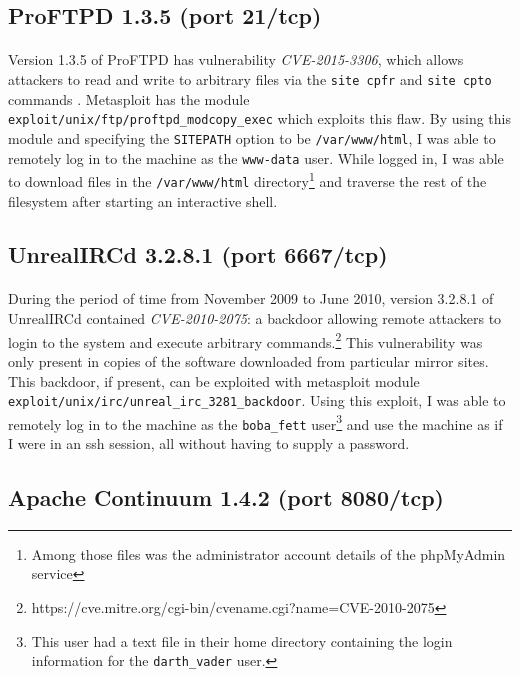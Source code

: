\documentclass{article}
\begin{document}
\subsection{ProFTPD 1.3.5 (port 21/tcp)}
\label{subsec:pro_ftpd}
\paragraph{}
Version 1.3.5 of ProFTPD has vulnerability \emph{CVE-2015-3306}, which allows attackers to read and write to arbitrary files via the \texttt{site cpfr} and \texttt{site cpto} commands \parencite{mitre20153306}.
Metasploit has the module \texttt{exploit/unix/ftp/proftpd\_modcopy\_exec} which exploits this flaw.
By using this module and specifying the \texttt{SITEPATH} option to be \texttt{/var/www/html}, I was able to remotely log in to the machine as the \texttt{www-data} user.
While logged in, I was able to download files in the \texttt{/var/www/html} directory\footnote{Among those files was the administrator account details of the phpMyAdmin service} and traverse the rest of the filesystem after starting an interactive shell.

\subsection{UnrealIRCd 3.2.8.1 (port 6667/tcp)}
\label{subsec:unreal_ircd}
\paragraph{}
During the period of time from November 2009 to June 2010, version 3.2.8.1 of UnrealIRCd contained \emph{CVE-2010-2075}: a backdoor allowing remote attackers to login to the system and execute arbitrary commands.\footnote{https://cve.mitre.org/cgi-bin/cvename.cgi?name=CVE-2010-2075}
This vulnerability was only present in copies of the software downloaded from particular mirror sites.
This backdoor, if present, can be exploited with metasploit module \texttt{exploit/unix/irc/unreal\_irc\_3281\_backdoor}.
Using this exploit, I was able to remotely log in to the machine as the \texttt{boba\_fett} user\footnote{This user had a text file in their home directory containing the login information for the \texttt{darth\_vader} user.} and use the machine as if I were in an ssh session, all without having to supply a password.

\subsection{Apache Continuum 1.4.2 (port 8080/tcp)}
\label{subsec:apache_continuum}
\end{document}
